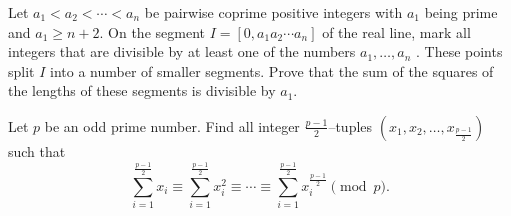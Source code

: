 \begin{question}[name={2014 IMO Shortlist}]
    Let $a_1 < a_2 <  \cdots <a_n$ be pairwise coprime positive integers with $a_1$ being prime and $a_1 \ge n + 2$. On the segment $I = [0, a_1 a_2  \cdots a_n ]$ of the real line, mark all integers that are divisible by at least one of the numbers $a_1 ,   \ldots , a_n$ . These points split $I$ into a number of smaller segments. Prove that the sum of the squares of the lengths of these segments is divisible by $a_1$.
\end{question}

\begin{question}[name={2020 Iran TST}]
    Let $p$ be an odd prime number. Find all integer $\frac{p-1}2$--tuples $\left(x_1,x_2,\dots,x_{\frac{p-1}2}\right)$ such that
    $$\sum_{i = 1}^{\frac{p-1}{2}} x_{i} \equiv \sum_{i = 1}^{\frac{p-1}{2}} x_{i}^{2} \equiv \cdots \equiv \sum_{i = 1}^{\frac{p-1}{2}} x_{i}^{\frac{p - 1}{2}} \pmod p.$$
\end{question}